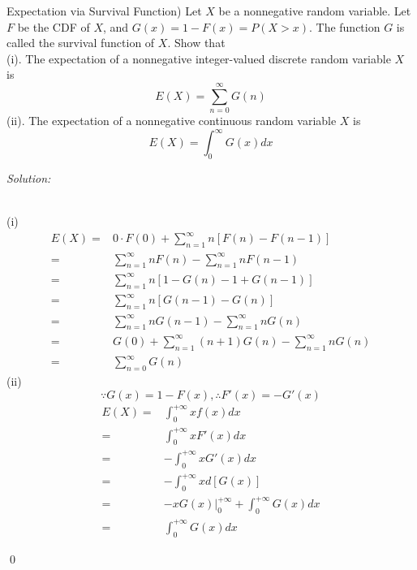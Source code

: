 \documentclass[12pt]{article}
\newenvironment{problem}[2][Problem]{\begin{trivlist}
\item[\hskip \labelsep {\bfseries #1}\hskip \labelsep {\bfseries #2.}]}{\end{trivlist}}
\newenvironment{sol}
    {\emph{Solution:}
    }
    {
    \qed
    }
\begin{document}
\begin{problem}{10}
(Expectation via Survival Function) Let $X$ be a nonnegative random variable. Let $F$ be the CDF of $X$, and $G(x) = 1-F(x) =P(X>x)$. The function $G$ is called the survival function of $X$. Show that \\(i). The expectation of a nonnegative integer-valued discrete random variable $X$ is \[E(X)=\sum_{n=0}^{\infty} G(n)\] 
(ii). The expectation of a nonnegative continuous random variable $X$ is \[E(X)=\int_0^{\infty} G(x)dx\]
\end{problem}
\begin{sol}
\\(i) 
\begin{align*}
E(X)=&0\cdot F(0)+\sum_{n=1}^{\infty}n[F(n)-F(n-1)]\\
=&\sum_{n=1}^{\infty}nF(n)-\sum_{n=1}^{\infty}nF(n-1)\\
=&\sum_{n=1}^{\infty}n[1-G(n)-1+G(n-1)]\\
=&\sum_{n=1}^{\infty}n[G(n-1)-G(n)]\\
=&\sum_{n=1}^{\infty}nG(n-1)-\sum_{n=1}^{\infty}nG(n)\\
=&G(0)+\sum_{n=1}^{\infty}(n+1)G(n)-\sum_{n=1}^{\infty}nG(n)\\
=&\sum_{n=0}^{\infty}G(n)
\end{align*}
(ii)
\[
\because G(x)=1-F(x),\therefore F'(x)=-G'(x)
\]
\begin{align*}
E(X)=&\int_0^{+\infty}xf(x)dx\\
=&\int_0^{+\infty}xF'(x)dx\\
=&-\int_0^{+\infty}xG'(x)dx\\
=&-\int_0^{+\infty}xd[G(x)]\\
=&-xG(x)|_0^{+\infty}+\int_0^{+\infty}G(x)dx\\
=&\int_0^{+\infty}G(x)dx
\end{align*}
\end{sol}
\end{document}
